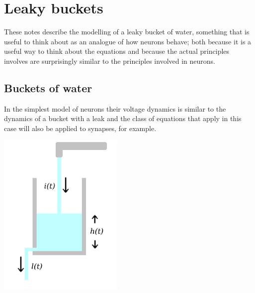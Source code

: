 \documentclass{article}
\begin{document}
\section*{Leaky buckets}

These notes describe the modelling of a leaky bucket of water,
something that is useful to think about as an analogue of how neurons
behave; both because it is a useful way to think about the equations
and because the actual principles involves are surprisingly similar to
the principles involved in neurons.

\subsection*{Buckets of water}

In the simplest model of neurons their voltage dynamics is similar to
the dynamics of a bucket with a leak and the class of equations that
apply in this case will also be applied to synapses, for example.


\begin{center}
  \includegraphics[width=6cm]{glass_notation.png}
  \end{center}
\end{document}
